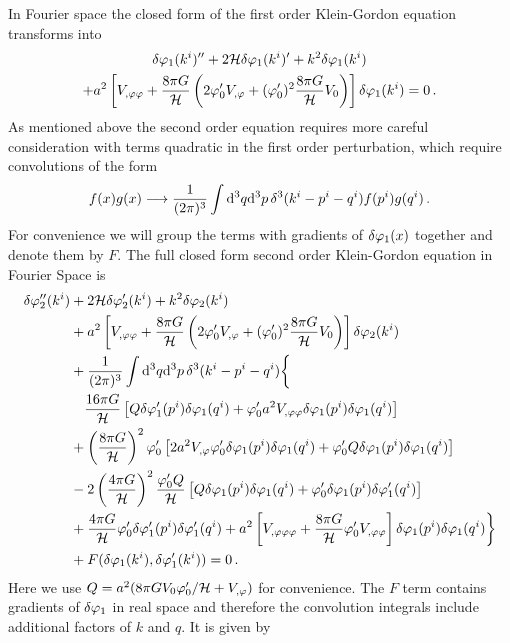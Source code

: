 In Fourier space the closed form of the first order Klein-Gordon equation
transforms into
%
\begin{multline}
\label{eq:fokg}
 \delta\varphi_{1}(k^i)'' + 2\mathcal{H} \delta\varphi_{1}(k^i)' + k^2\delta\varphi_{1}(k^i) \\
+ a^2 \left[V_{,\varphi\varphi} +
\frac{8\pi G}{\mathcal{H}}\left(2\varphi_{0}' V_{,\varphi} + (\varphi_{0}')^2\frac{8\pi G
}{\mathcal{H}}V_{0}\right)\right]\delta\varphi_{1}(k^i) = 0 \,.
\end{multline}
%
As mentioned above the second order equation requires more careful
consideration with terms quadratic in the first order perturbation, which
 require convolutions of the form
%
\begin{equation}
 f(x)g(x) \longrightarrow \frac{1}{(2 \pi)^3} \int \mathrm{d}^3q \mathrm{d}^3p\, \delta^3(k^i
-p^i -q^i) f(p^i)
g(q^i) \,.
\end{equation}
%
For convenience we will group the terms with gradients of $\delta\varphi_{1}(x)$
together and denote them by $F$. 
The full closed form second order Klein-Gordon
equation in Fourier Space is
%  
\begin{align}
\label{eq:SOKG-real-num}
\dvp2''(\kvi) &+ 2\H \dvp2'(\kvi) + k^2 \dvp2(\kvi) \nonumber \\
%
&+ a^2\left[\Upp + \frac{8\pi G}{\H}\left(2\vp_{0}'\Uphi
+ (\vp_0')^2\frac{8\pi G}{\H}\U \right) \right]\dvp2(\kvi) \nonumber \\
% 
&+ \frac{1}{(2\pi)^3}\int \d^3q \d^3p\, \delta^3(\kvi -\pvi -\qvi) \biggl\{
\biggr.\nonumber\\
&\quad \frac{16\pi G}{\H} \left[ Q \dvp1'(\pvi) \dvp1(\qvi) + \vp_{0}' a^2\Upp
\dvp1(\pvi)\dvp1(\qvi) \right]  \nonumber \\
%
&+ \left(\frac{8\pi G}{\H}\right)^2\vp_{0}'\left[2a^2\Uphi\vp_{0}'
\dvp1(\pvi)\dvp1(\qvi) + \vp_{0}'Q\dvp1(\pvi)\dvp1(\qvi) \right]
\nonumber \\
%
&- 2\left(\frac{4\pi G}{\H}\right)^2\frac{\vp_{0}' Q}{\H} \left[Q\dvp1(\pvi)
\dvp1(\qvi) +
\vp_{0}' \dvp1(\pvi) \dvp1'(\qvi)\right] \nonumber \\
%
\biggl. &+ \frac{4\pi G}{\H} \vp_{0}' \dvp1'(\pvi) \dvp1'(\qvi) 
 + a^2\left[\Uppp + \frac{8\pi G}{\H}\vp_{0}' \Upp\right] \dvp1(\pvi)
\dvp1(\qvi) \biggr\} \nonumber \\
&+ F(\dvp1(\kvi), \dvp1'(\kvi)) = 0\,.
\end{align}
%
Here we use $Q=a^2 (8\pi G V_{0} \varphi_0'/\mathcal{H} + V_{,\varphi})$ for convenience.
The $F$ term contains gradients of $\delta\varphi_{1}$ in real space and therefore
the convolution integrals include additional factors of $k$ and
$q$. It is given by
%
